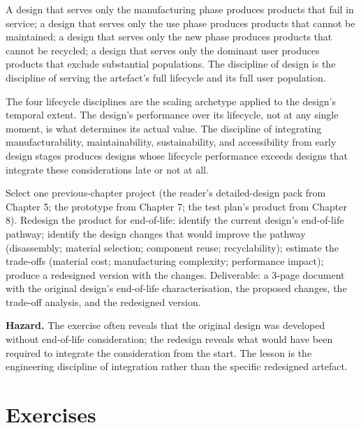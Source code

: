\begin{principle}
A design that serves only the manufacturing phase produces products that fail in service; a design that serves only the use phase produces products that cannot be maintained; a design that serves only the new phase produces products that cannot be recycled; a design that serves only the dominant user produces products that exclude substantial populations. The discipline of design is the discipline of serving the artefact's full lifecycle and its full user population.
\end{principle}

\begin{archetype}[scaling]
The four lifecycle disciplines are the scaling archetype applied to the design's temporal extent. The design's performance over its lifecycle, not at any single moment, is what determines its actual value. The discipline of integrating manufacturability, maintainability, sustainability, and accessibility from early design stages produces designs whose lifecycle performance exceeds designs that integrate these considerations late or not at all.
\end{archetype}

\begin{project}
Select one previous-chapter project (the reader's detailed-design pack from Chapter 5; the prototype from Chapter 7; the test plan's product from Chapter 8). Redesign the product for end-of-life: identify the current design's end-of-life pathway; identify the design changes that would improve the pathway (disassembly; material selection; component reuse; recyclability); estimate the trade-offs (material cost; manufacturing complexity; performance impact); produce a redesigned version with the changes. Deliverable: a 3-page document with the original design's end-of-life characterisation, the proposed changes, the trade-off analysis, and the redesigned version.

\textbf{Hazard.} The exercise often reveals that the original design was developed without end-of-life consideration; the redesign reveals what would have been required to integrate the consideration from the start. The lesson is the engineering discipline of integration rather than the specific redesigned artefact.
\end{project}

\section{Exercises}

